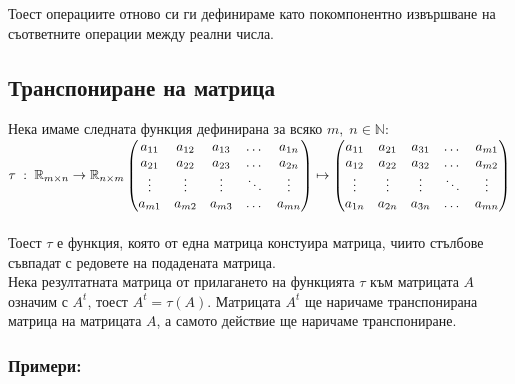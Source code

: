 \documentclass[12pt]{article}
\newcommand{\N}{\mathbb{N}}
\newcommand{\R}{\mathbb{R}}
\begin{document}
Тоест операциите отново си ги дефинираме като покомпонентно извършване на съответните операции между реални числа.

\subsection*{Транспониране на матрица}

Нека имаме следната функция дефинирана за всяко $m, \; n \in \N$: \\

$\tau \; : \; \R_{m \times n} \to \R_{n \times m} \\\\
\begin{pmatrix}
    a_{11} & a_{12} & a_{13} & \dots  & a_{1n} \\
    a_{21} & a_{22} & a_{23} & \dots  & a_{2n} \\
    \vdots & \vdots & \vdots & \ddots & \vdots \\
    a_{m1} & a_{m2} & a_{m3} & \dots  & a_{mn}
\end{pmatrix} \mapsto \begin{pmatrix}
    a_{11} & a_{21} & a_{31} & \dots  & a_{m1} \\
    a_{12} & a_{22} & a_{32} & \dots  & a_{m2} \\
    \vdots & \vdots & \vdots & \ddots & \vdots \\
    a_{1n} & a_{2n} & a_{3n} & \dots  & a_{mn}
\end{pmatrix}$ \\\\

Тоест $\tau$ е функция, която от една матрица констуира матрица, чиито стълбове съвпадат с редовете на подадената матрица. \\

Нека резултатната матрица от прилагането на функцията $\tau$ към матрицата $A$ означим с $A^t$, тоест $A^t = \tau(A)$.
Матрицата $A^t$ ще наричаме транспонирана матрица на матрицата $A$, а самото действие ще наричаме транспониране. 

\subsubsection*{Примери:}
\end{document}
